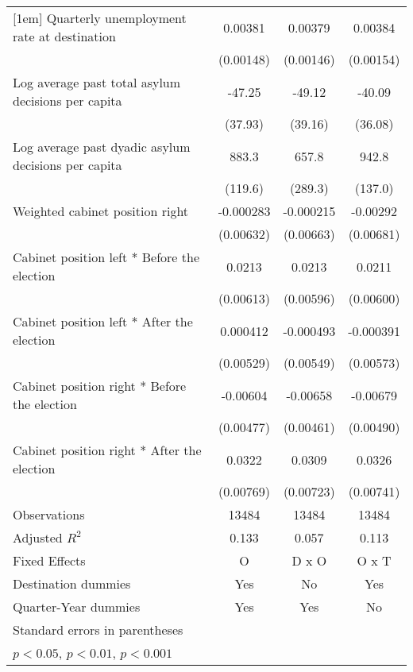 \begin{table}[htbp]
\begin{tabular}{l*{3}{c}}
[1em]
Quarterly unemployment rate at destination&     0.00381\sym{*}  &     0.00379\sym{*}  &     0.00384\sym{*}  \\
                    &   (0.00148)         &   (0.00146)         &   (0.00154)         \\
[1em]
Log average past total asylum decisions per capita&      -47.25         &      -49.12         &      -40.09         \\
                    &     (37.93)         &     (39.16)         &     (36.08)         \\
[1em]
Log average past dyadic asylum decisions per capita&       883.3\sym{***}&       657.8\sym{*}  &       942.8\sym{***}\\
                    &     (119.6)         &     (289.3)         &     (137.0)         \\
[1em]
Weighted cabinet position right&   -0.000283         &   -0.000215         &    -0.00292         \\
                    &   (0.00632)         &   (0.00663)         &   (0.00681)         \\
[1em]
Cabinet position left * Before the election&      0.0213\sym{**} &      0.0213\sym{***}&      0.0211\sym{***}\\
                    &   (0.00613)         &   (0.00596)         &   (0.00600)         \\
[1em]
Cabinet position left * After the election&    0.000412         &   -0.000493         &   -0.000391         \\
                    &   (0.00529)         &   (0.00549)         &   (0.00573)         \\
[1em]
Cabinet position right * Before the election&    -0.00604         &    -0.00658         &    -0.00679         \\
                    &   (0.00477)         &   (0.00461)         &   (0.00490)         \\
[1em]
Cabinet position right * After the election&      0.0322\sym{***}&      0.0309\sym{***}&      0.0326\sym{***}\\
                    &   (0.00769)         &   (0.00723)         &   (0.00741)         \\
\hline
Observations        &       13484         &       13484         &       13484         \\
Adjusted \(R^{2}\)  &       0.133         &       0.057         &       0.113         \\
Fixed Effects       &           O         &       D x O         &       O x T         \\
Destination dummies &         Yes         &          No         &         Yes         \\
Quarter-Year dummies&         Yes         &         Yes         &          No         \\
\hline\hline
\multicolumn{4}{l}{\footnotesize Standard errors in parentheses}\\
\multicolumn{4}{l}{\footnotesize \sym{*} \(p<0.05\), \sym{**} \(p<0.01\), \sym{***} \(p<0.001\)}\\
\end{tabular}
\end{table}
